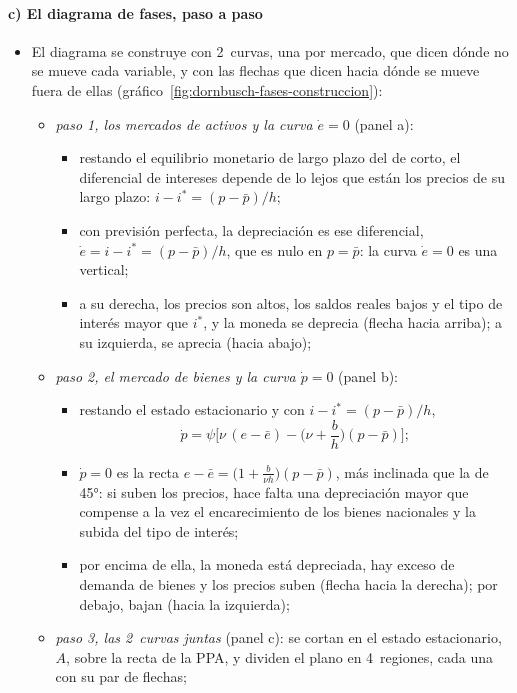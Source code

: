 \documentclass[11pt]{article}
\begin{document}
\paragraph{c) El diagrama de fases, paso a paso}
\begin{itemize}
\item El diagrama se construye con 2~curvas, una por mercado, que dicen dónde no se mueve cada variable, y con las flechas que dicen hacia dónde se mueve fuera de ellas (gráfico~\ref{fig:dornbusch-fases-construccion}):
  \begin{itemize}
  \item \emph{paso 1, los mercados de activos y la curva $\dot e=0$} (panel a):
    \begin{itemize}
    \item restando el equilibrio monetario de largo plazo del de corto, el diferencial de intereses depende de lo lejos que están los precios de su largo plazo: $i-i^*=(p-\bar p)/h$;
    \item con previsión perfecta, la depreciación es ese diferencial, $\dot e=i-i^*=(p-\bar p)/h$, que es nulo en $p=\bar p$: la curva $\dot e=0$ es una vertical;
    \item a su derecha, los precios son altos, los saldos reales bajos y el tipo de interés mayor que $i^*$, y la moneda se deprecia (flecha hacia arriba); a su izquierda, se aprecia (hacia abajo);
    \end{itemize}
  \item \emph{paso 2, el mercado de bienes y la curva $\dot p=0$} (panel b):
    \begin{itemize}
    \item restando el estado estacionario y con $i-i^*=(p-\bar p)/h$,
      \[
      \dot p=\psi\Big[\nu\,(e-\bar e)-\Big(\nu+\frac{b}{h}\Big)(p-\bar p)\Big];
      \]
    \item $\dot p=0$ es la recta $e-\bar e=\big(1+\tfrac{b}{\nu h}\big)(p-\bar p)$, más inclinada que la de 45°: si suben los precios, hace falta una depreciación mayor que compense a la vez el encarecimiento de los bienes nacionales y la subida del tipo de interés;
    \item por encima de ella, la moneda está depreciada, hay exceso de demanda de bienes y los precios suben (flecha hacia la derecha); por debajo, bajan (hacia la izquierda);
    \end{itemize}
  \item \emph{paso 3, las 2~curvas juntas} (panel c): se cortan en el estado estacionario, $A$, sobre la recta de la PPA, y dividen el plano en 4~regiones, cada una con su par de flechas;

\end{itemize}
\end{itemize}
\end{document}
